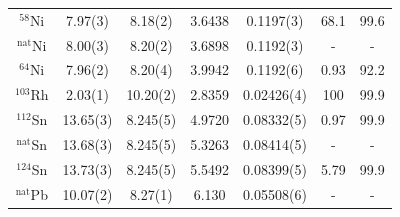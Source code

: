 \begin{table}[ht]
\begin{center}
\begin{tabular}{ c c c c c c c }
            $^{58}$Ni & 7.97(3)& 8.18(2) &
            3.6438 & 0.1197(3)& 68.1 & 99.6 \\
            $^{\text{nat}}$Ni & 8.00(3) & 8.20(2) &
            3.6898 & 0.1192(3)& - & -\\
            $^{64}$Ni & 7.96(2) & 8.20(4) &
            3.9942 & 0.1192(6) & 0.93 & 92.2\\

            $^{103}$Rh & 2.03(1) & 10.20(2) & 2.8359 & 0.02426(4) & 100 & 99.9\\

            $^{112}$Sn & 13.65(3) & 8.245(5) &
            4.9720 & 0.08332(5) & 0.97 & 99.9\\
            $^{\text{nat}}$Sn & 13.68(3) & 8.245(5) &
            5.3263 & 0.08414(5) & - & -\\
            $^{124}$Sn & 13.73(3) & 8.245(5) &
            5.5492 & 0.08399(5) & 5.79 & 99.9\\

            $^{\text{nat}}$Pb & 10.07(2) & 8.27(1) & 6.130 &
            0.05508(6) & - & -\\

            \hline
        \end{tabular}
    \end{center}
\end{table}

